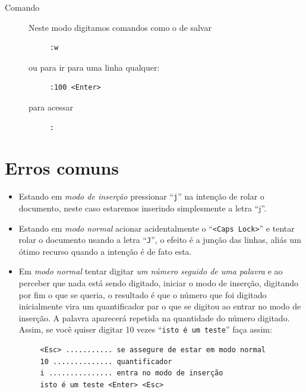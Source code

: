 \documentclass[10pt,a4paper,openany]{book}
\begin{document}
\begin{description}
\item [Comando] Neste modo digitamos comandos como o de salvar

\begin{verbatim}
     :w
\end{verbatim}

ou para ir para uma linha qualquer:

\begin{verbatim}
     :100 <Enter>
\end{verbatim}

para acessar
\begin{verbatim}
     :
\end{verbatim}

\end{description}

\section{Erros comuns}\label{sec:Erros comuns}

\begin{itemize}

\item Estando em {\em{modo de inserção}} pressionar ``\verb+j+'' na intenção
de rolar o documento, neste caso estaremos inserindo simplesmente a letra ``j''. 

\item Estando em {\em{modo normal}} acionar acidentalmente o ``\verb+<Caps Lock>+'' 
e tentar rolar o documento usando a letra ``\verb+J+'', o efeito é a
junção das linhas, aliás um ótimo recurso quando a intenção é de fato esta.

\item Em {\em{modo normal}} tentar digitar {\em{um número seguido de uma palavra}} e ao perceber que 
nada está sendo digitado, iniciar o modo de inserção, digitando por fim o que se queria, 
o resultado é que o número que foi digitado inicialmente vira um quantificador par o que 
se digitou ao entrar no modo de inserção. A palavra aparecerá repetida na quantidade do 
número digitado. Assim, se você quiser digitar 10 vezes ``\verb+isto é um teste+''
 faça assim:

\begin{verbatim}
     <Esc> ........... se assegure de estar em modo normal
     10 .............. quantificador
     i ............... entra no modo de inserção
     isto é um teste <Enter> <Esc>  
\end{verbatim}

\end{itemize}
\end{document}

